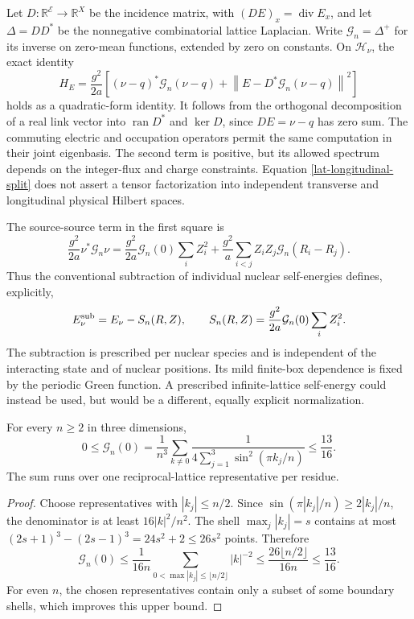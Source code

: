 Let $D:\mathbb R^{\mathcal E}\to\mathbb R^X$ be the incidence
matrix, with $(DE)_x=\operatorname{div}E_x$, and let
$\Delta=DD^*$ be the nonnegative combinatorial lattice Laplacian.
Write $\mathcal G_n=\Delta^+$ for its inverse on zero-mean functions,
extended by zero on constants.  On $\mathcal H_\nu$, the exact identity
\begin{equation}
 H_E=\frac{g^2}{2a}
 \left[(\nu-q)^*\mathcal G_n(\nu-q)
       +\left\|E-D^*\mathcal G_n(\nu-q)\right\|^2\right]
 \label{lat-longitudinal-split}
\end{equation}
holds as a quadratic-form identity.  It follows from the orthogonal
decomposition of a real link vector into $\operatorname{ran}D^*$
and $\ker D$, since $DE=\nu-q$ has zero sum.  The commuting electric
and occupation operators permit the same computation in their joint
eigenbasis.  The second term is positive, but its allowed spectrum
depends on the integer-flux and charge constraints.  Equation
\eqref{lat-longitudinal-split} does not assert a tensor factorization
into independent transverse and longitudinal physical Hilbert spaces.

The source-source term in the first square is
\begin{equation}
 \frac{g^2}{2a}\nu^*\mathcal G_n\nu
 =\frac{g^2}{2a}\mathcal G_n(0)\sum_iZ_i^2
   +\frac{g^2}{a}\sum_{i<j}Z_iZ_j\mathcal G_n(R_i-R_j).
 \label{lat-source-self}
\end{equation}
Thus the conventional subtraction of individual nuclear self-energies
defines, explicitly,
\begin{equation}
 E_\nu^{\rm sub}=E_\nu-S_n(R,Z),\qquad
 S_n(R,Z)=\frac{g^2}{2a}\mathcal G_n(0)\sum_iZ_i^2.
 \label{lat-self-subtraction}
\end{equation}
The subtraction is prescribed per nuclear species and is independent
of the interacting state and of nuclear positions.  Its mild finite-box
dependence is fixed by the periodic Green function.  A prescribed
infinite-lattice self-energy could instead be used, but would be a
different, equally explicit normalization.

\begin{lemma}
\label{lat-green-bound}
For every $n\ge2$ in three dimensions,
\begin{equation}
 0\le\mathcal G_n(0)
  =\frac1{n^3}\sum_{k\ne0}
       \frac1{4\sum_{j=1}^3\sin^2(\pi k_j/n)}\le\frac{13}{16}.
 \label{lat-green-diagonal}
\end{equation}
The sum runs over one reciprocal-lattice representative per residue.
\end{lemma}
\begin{proof}
Choose representatives with $|k_j|\le n/2$.  Since
$\sin(\pi|k_j|/n)\ge2|k_j|/n$, the denominator is at least
$16|k|^2/n^2$.  The shell $\max_j|k_j|=s$ contains at most
$(2s+1)^3-(2s-1)^3=24s^2+2\le26s^2$ points.  Therefore
\[
 \mathcal G_n(0)\le\frac1{16n}
      \sum_{0<\max|k_j|\le\lfloor n/2\rfloor}|k|^{-2}
 \le\frac{26\lfloor n/2\rfloor}{16n}\le\frac{13}{16}.
\]
For even $n$, the chosen representatives contain only a subset of some
boundary shells, which improves this upper bound.
\end{proof}

